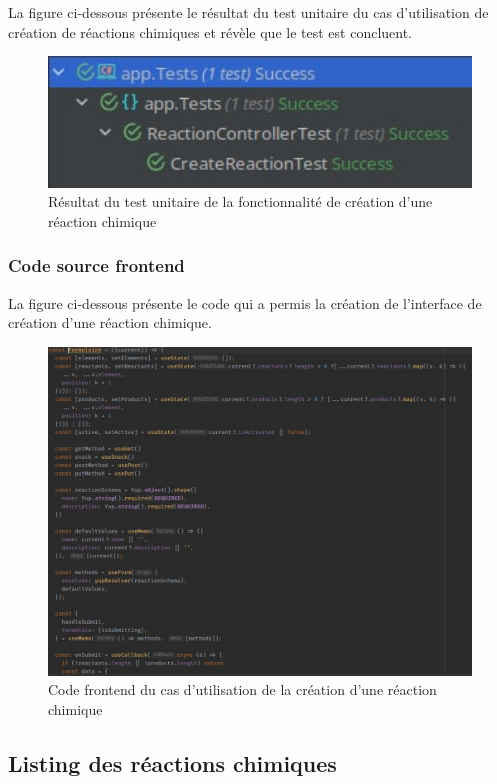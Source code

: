 La figure ci-dessous présente le résultat du test unitaire du cas d'utilisation de création de réactions chimiques et révèle que le test est concluent.

\begin{figure}[H]
	\centering
	\includegraphics[width=1\textwidth]{img/utcre}
	\caption{Résultat du test unitaire de la fonctionnalité de création d'une réaction chimique}
\end{figure}

\subsubsection{Code source frontend}

La figure ci-dessous présente le code qui a permis la création de l'interface de création d'une réaction chimique.

\begin{figure}[H]
	\centering
	\includegraphics[width=1\textwidth]{img/frec}
	\caption{Code frontend du cas d'utilisation de la création d'une réaction chimique}
\end{figure}

\subsection{Listing des réactions chimiques}

